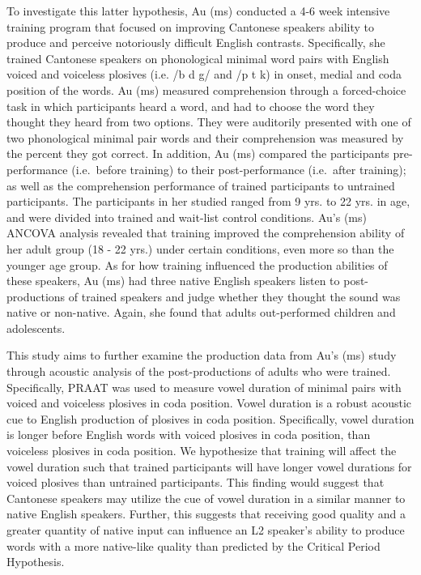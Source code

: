 \documentclass[man]{apa6}
\theoremstyle{definition}
\theoremstyle{definition}
\theoremstyle{definition}
\theoremstyle{remark}
\begin{document}
To investigate this latter hypothesis, Au (ms) conducted a 4-6 week
intensive training program that focused on improving Cantonese speakers
ability to produce and perceive notoriously difficult English contrasts.
Specifically, she trained Cantonese speakers on phonological minimal
word pairs with English voiced and voiceless plosives (i.e. /b d g/ and
/p t k) in onset, medial and coda position of the words. Au (ms)
measured comprehension through a forced-choice task in which
participants heard a word, and had to choose the word they thought they
heard from two options. They were auditorily presented with one of two
phonological minimal pair words and their comprehension was measured by
the percent they got correct. In addition, Au (ms) compared the
participants pre-performance (i.e.~before training) to their
post-performance (i.e.~after training); as well as the comprehension
performance of trained participants to untrained participants. The
participants in her studied ranged from 9 yrs. to 22 yrs. in age, and
were divided into trained and wait-list control conditions. Au's (ms)
ANCOVA analysis revealed that training improved the comprehension
ability of her adult group (18 - 22 yrs.) under certain conditions, even
more so than the younger age group. As for how training influenced the
production abilities of these speakers, Au (ms) had three native English
speakers listen to post-productions of trained speakers and judge
whether they thought the sound was native or non-native. Again, she
found that adults out-performed children and adolescents.

This study aims to further examine the production data from Au's (ms)
study through acoustic analysis of the post-productions of adults who
were trained. Specifically, PRAAT was used to measure vowel duration of
minimal pairs with voiced and voiceless plosives in coda position. Vowel
duration is a robust acoustic cue to English production of plosives in
coda position. Specifically, vowel duration is longer before English
words with voiced plosives in coda position, than voiceless plosives in
coda position. We hypothesize that training will affect the vowel
duration such that trained participants will have longer vowel durations
for voiced plosives than untrained participants. This finding would
suggest that Cantonese speakers may utilize the cue of vowel duration in
a similar manner to native English speakers. Further, this suggests that
receiving good quality and a greater quantity of native input can
influence an L2 speaker's ability to produce words with a more
native-like quality than predicted by the Critical Period Hypothesis.
\end{document}

